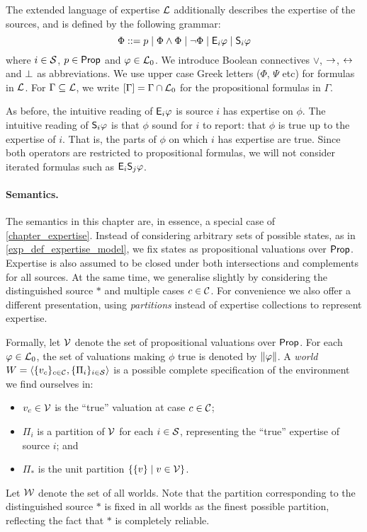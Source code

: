 The extended language of expertise $\lext$ additionally describes the
expertise of the sources, and is defined by the following grammar:
\[
    \Phi ::= p \mid
             \Phi \land \Phi \mid
             \neg \Phi \mid
             \E_i\phi \mid
             \S_i\phi
             \\
\]
where $i\in \srcs$, $p \in \propvars$ and $\phi \in \lprop$. We introduce
Boolean connectives $\lor$, $\limplies$, $\liff$ and $\falsum$ as
abbreviations. We use upper case Greek letters ($\Phi$, $\Psi$ etc) for
formulas in $\lext$.
%
For $\Gamma \subseteq \lext$, we write $\proppart{\Gamma} = \Gamma \cap
\lprop$ for the propositional formulas in $\Gamma$.

As before, the intuitive reading of $\E_i\phi$ is source $i$ has expertise on
$\phi$. The intuitive reading of $\S_i\phi$ is that $\phi$ sound for $i$ to
report: that $\phi$ is true up to the expertise of $i$. That is, the parts of
$\phi$ on which $i$ has expertise are true. Since both operators are restricted
to propositional formulas, we will not consider iterated formulas such as
$\E_i\S_j\phi$.

\paragraph{Semantics.}

The semantics in this chapter are, in essence, a special case of
\cref{chapter_expertise}. Instead of considering arbitrary sets of possible
states, as in \cref{exp_def_expertise_model}, we fix states as propositional
valuations over $\propvars$. Expertise is also assumed to be closed under both
intersections and complements for all sources.
%
At the same time, we generalise slightly by considering the distinguished
source $\ast$ and multiple cases $c \in \C$. For convenience we also offer a
different presentation, using \emph{partitions} instead of expertise
collections to represent expertise.

Formally, let $\vals$ denote the set of propositional valuations over
$\propvars$. For each $\phi \in \lprop$, the set of valuations making $\phi$
true is denoted by $\propmods{\phi}$. A \emph{world} $W = \tuple{\{v_c\}_{c \in
\C}, \{\Pi_i\}_{i \in \srcs}}$ is a possible complete specification of the
environment we find ourselves in:
\begin{itemize}
    \item $v_c \in \vals$ is the ``true'' valuation at case $c \in \C$;
    \item $\Pi_i$ is a partition of $\vals$ for each $i \in \srcs$, representing
          the ``true'' expertise of source $i$; and
    \item $\Pi_\ast$ is the unit partition $\{\{v\} \mid v \in \vals\}$.
\end{itemize}
Let $\W$ denote the set of all worlds. Note that the partition corresponding
to the distinguished source $\ast$ is fixed in all worlds as the finest
possible partition, reflecting the fact that $\ast$ is completely reliable.

